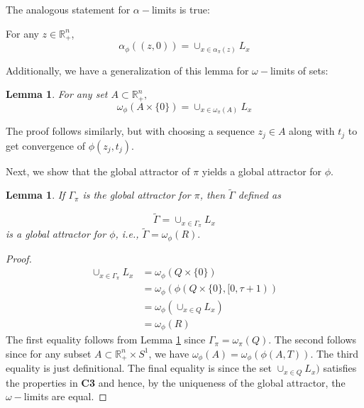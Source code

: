 \documentclass{article}
\newtheorem{lemma}[theorem]{Lemma}
\theoremstyle{definition}
\newcommand{\R}{{\mathbb{R}}}
\begin{document}
The analogous statement for $\alpha-$limits is true:

For any $z\in\R_+^n$, $$\alpha_\phi((z,0)) = \cup_{x\in \alpha_\pi(z)} L_x $$

Additionally, we have a generalization of this lemma for $\omega-$limits of sets:

\begin{lemma}\label{omega_sets}
    For any set $A\subset \R_+^n,$
    $$
    \omega_\phi(A\times \{0\}) = \cup_{x\in \omega_\pi(A)} L_x 
    $$
\end{lemma}

The proof follows similarly, but with choosing a sequence $z_j \in A$ along with $t_j$ to get convergence of $\phi(z_j, t_j)$. 


Next, we show that the global attractor of $\pi$ yields a global attractor for $\phi$.

\begin{lemma}
    If $\Gamma_\pi$ is the global attractor for $\pi$, then  $\tilde{\Gamma}$ defined as

\begin{equation}
    \tilde{\Gamma} = \cup_{x\in \Gamma_\pi} L_x
\end{equation}
is a global attractor for $\phi$, i.e., $\tilde{\Gamma} = \omega_\phi(R).$
\end{lemma}

\begin{proof}
\begin{align*}
    \cup_{x\in \Gamma_\pi} L_x &= \omega_\phi(Q\times \{0\})\\
    & = \omega_\phi (\phi(Q\times \{0\}, [0,\tau+1))\\
    & = \omega_\phi (\cup_{x\in Q} L_x)\\
    & = \omega_\phi(R)
\end{align*}
The first equality follows from Lemma \ref{omega_sets} since $\Gamma_\pi=\omega_\pi(Q)$.
The second follows since for any subset $A\subset \R_+^n\times S^1$, we have $\omega_\phi(A) = \omega_\phi(\phi(A,T))$. 
The third equality is just definitional.  The final equality is since the set $\cup_{x\in Q} L_x)$ satisfies the properties in \textbf{C3} and hence, by the uniqueness of the global attractor, the $\omega-$limits are equal.

\end{proof}
\end{document}
